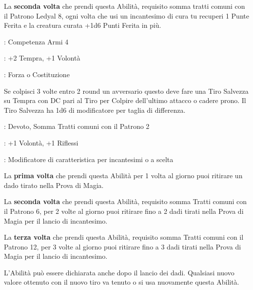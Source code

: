 \begin{multicols}{2}
La \textbf{seconda volta} che prendi questa Abilità, requisito somma tratti comuni con il Patrono Ledyal 8, ogni volta che usi un incantesimo di cura tu recuperi 1 Punte Ferita e la creatura curata +1d6 Punti Ferita in più.

\begin{description}[noitemsep, topsep=0pt, parsep=0pt, partopsep=0pt, leftmargin=0cm, labelwidth=2.5cm]
    \item[\textbf{Requisito}]: Competenza Armi 4
    \item[\textbf{Tiri Salvezza}]: +2 Tempra, +1 Volontà
    \item[\textbf{Caratteristica}]: Forza o Costituzione
\end{description}

Se colpisci 3 volte entro 2 round un avversario questo deve fare una Tiro Salvezza su Tempra con DC pari al Tiro per Colpire dell'ultimo attacco o cadere prono. Il Tiro Salvezza ha 1d6 di modificatore per taglia di differenza.

\begin{description}[noitemsep, topsep=0pt, parsep=0pt, partopsep=0pt, leftmargin=0cm, labelwidth=2.5cm]
    \item[\textbf{Requisito}]: Devoto, Somma Tratti comuni con il Patrono 2
    \item[\textbf{Tiri Salvezza}]: +1 Volontà, +1 Riflessi
    \item[\textbf{Caratteristica}]: Modificatore di caratteristica per incantesimi o a scelta
\end{description}

La \textbf{prima volta} che prendi questa Abilità per 1 volta al giorno puoi ritirare un dado tirato nella Prova di Magia.

La \textbf{seconda volta} che prendi questa Abilità, requisito somma Tratti comuni con il Patrono 6, per 2 volte al giorno puoi ritirare fino a 2 dadi tirati nella Prova di Magia per il lancio di incantesimo.

La \textbf{terza volta} che prendi questa Abilità, requisito somma Tratti comuni con il Patrono 12, per 3 volte al giorno puoi ritirare fino a 3 dadi tirati nella Prova di Magia per il lancio di incantesimo.

L'Abilità può essere dichiarata anche dopo il lancio dei dadi. Qualsiasi nuovo valore ottenuto con il nuovo tiro va tenuto o si usa nuovamente questa Abilità.


\end{multicols}
